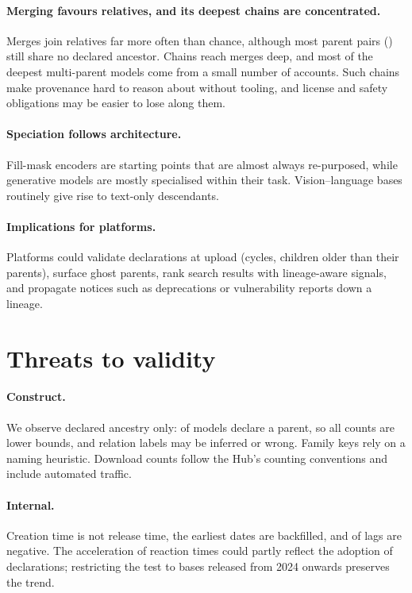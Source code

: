 \documentclass[11pt]{article}
\begin{document}
\paragraph{Merging favours relatives, and its deepest chains are concentrated.} Merges join relatives far more often than chance, although most parent pairs (\pctOutcross) still share no declared ancestor. Chains reach \hybDepthMax merges deep, and most of the deepest multi-parent models come from a small number of accounts. Such chains make provenance hard to reason about without tooling, and license and safety obligations may be easier to lose along them.

\paragraph{Speciation follows architecture.} Fill-mask encoders are starting points that are almost always re-purposed, while generative models are mostly specialised within their task. Vision--language bases routinely give rise to text-only descendants.

\paragraph{Implications for platforms.} Platforms could validate declarations at upload (cycles, children older than their parents), surface ghost parents, rank search results with lineage-aware signals, and propagate notices such as deprecations or vulnerability reports down a lineage.

\section{Threats to validity}\label{sec:threats}
\paragraph{Construct.} We observe declared ancestry only: \pctDeclare of models declare a parent, so all counts are lower bounds, and relation labels may be inferred or wrong. Family keys rely on a naming heuristic. Download counts follow the Hub's counting conventions and include automated traffic.
\paragraph{Internal.} Creation time is not release time, the earliest dates are backfilled, and \pctNegLag of lags are negative. The acceleration of reaction times could partly reflect the adoption of declarations; restricting the test to bases released from 2024 onwards preserves the trend.
\end{document}
